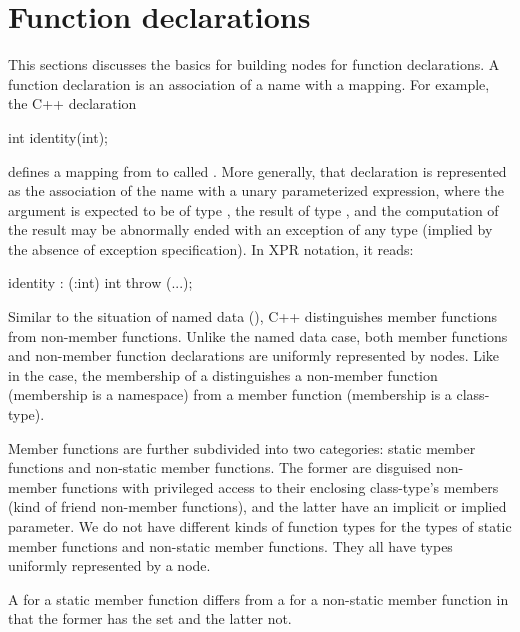 \documentclass[11pt]{article}
\begin{document}
\section{Function declarations}
\label{sec:fun-decl}

This sections discusses the basics for  building nodes for function
declarations.  A function declaration is an association of a name with a
mapping.  For example, the C++ declaration 
\begin{Program}
  int identity(int);
\end{Program}
defines a mapping from  to  called .
More generally, that declaration is represented as the association of the name
 with a 
unary parameterized expression, where the argument is expected to be of type
, the result of type , and the computation of the result
may be abnormally ended with an exception of any type (implied by the absence
of exception specification).  In XPR notation, it reads:
\begin{Program}
  identity : (:int) int throw (...);
\end{Program}

Similar to the situation of named data (), C++
distinguishes member functions from non-member functions.  Unlike the
named data case, both member functions and non-member function declarations
are uniformly represented by  nodes. Like in the 
case, the membership of a  distinguishes a non-member function
(membership is a namespace) from a member function (membership is a
class-type). 

Member functions  are further subdivided into two categories: static
member functions and non-static member functions.  The former are disguised
non-member functions with privileged access to their enclosing class-type's
members (kind of friend non-member functions), and the latter have an implicit
or implied parameter.  We do not have different kinds of function types for
the types of static member functions and non-static member functions. They 
all have types uniformly represented by a  node.

A  for a static member function differs from a 
for a non-static member function in that the former has the
 set and the latter not.  
\end{document}
